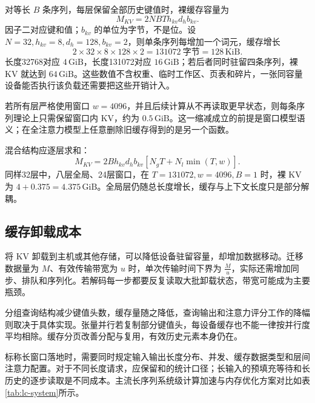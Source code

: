\documentclass[../textbook.tex]{subfiles}
\begin{document}
\begin{example}
对等长 $B$ 条序列，每层保留全部历史键值时，裸缓存容量为
\begin{equation*} M_{KV}=2NBTh_{kv}d_hb_{kv}.
\end{equation*}
因子二对应键和值；$b_{kv}$ 的单位为字节，不是位。设 $N=32,h_{kv}=8,d_h=128,b_{kv}=2$，则单条序列每增加一个词元，缓存增长
\begin{equation*}
 2\times32\times8\times128\times2
 =131072\ \text{字节}=128\,\mathrm{KiB}.
\end{equation*}
长度32768对应 $4\,\mathrm{GiB}$，长度131072对应 $16\,\mathrm{GiB}$；若后者同时驻留四条序列，裸 KV 就达到 $64\,\mathrm{GiB}$。这些数值不含权重、临时工作区、页表和碎片，一张同容量设备能否执行该负载还需要把这些开销计入。

若所有层严格使用窗口 $w=4096$，并且后续计算从不再读取更早状态，则每条序列理论上只需保留窗口内 KV，约为 $0.5\,\mathrm{GiB}$。这一缩减成立的前提是窗口模型语义；在全注意力模型上任意删除旧缓存得到的是另一个函数。

混合结构应逐层求和：
\begin{equation*}
 M_{KV}=2Bh_{kv}d_hb_{kv}
 [N_gT+N_l\min(T,w)].
\end{equation*}
同样32层中，八层全局、24层窗口，在 $T=131072,w=4096,B=1$ 时，裸 KV 为 $4+0.375=4.375\,\mathrm{GiB}$。全局层仍随总长度增长，缓存与上下文长度只是部分解耦。
\end{example}

\subsection{缓存卸载成本}
将 KV 卸载到主机或其他存储，可以降低设备驻留容量，却增加数据移动。迁移数据量为 $M$、有效传输带宽为 $u$ 时，单次传输时间下界为 $\frac{M}{u}$，实际还需增加同步、排队和序列化。若解码每一步都要反复读取大批卸载状态，带宽可能成为主要瓶颈。

分组查询结构减少键值头数，缓存量随之降低，查询输出和注意力评分工作的降幅则取决于具体实现。张量并行若复制部分键值头，每设备缓存也不能一律按并行度平均相除。缓存分页改善分配与复用，有效历史元素本身仍在。

标称长窗口落地时，需要同时规定输入输出长度分布、并发、缓存数据类型和层间注意力配置。对于不同长度请求，应保留和的统计口径；长输入的预填充等待和长历史的逐步读取是不同成本。主流长序列系统级计算加速与内存优化方案对比如表\ref{tab:lc-system}所示。
\end{document}
